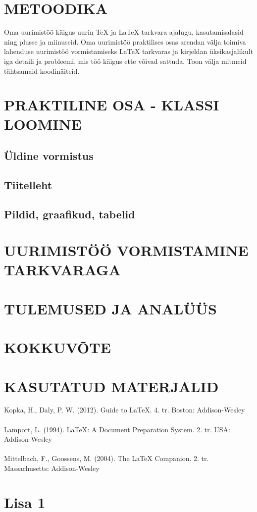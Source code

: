 \documentclass{21kuur}
\begin{document}
\chapter{METOODIKA}
Oma uurimistöö käigus uurin TeX ja LaTeX tarkvara ajalugu, kasutamisalasid ning plusse ja miinuseid. Oma uurimistöö praktilises osas arendan välja toimiva lahenduse uurimistöö vormistamiseks LaTeX tarkvaras ja kirjeldan üksikasjalikult iga detaili ja probleemi, mis töö käigus ette võivad sattuda. Toon välja mitmeid tähtsamaid koodinäiteid.

\chapter{PRAKTILINE OSA - KLASSI LOOMINE}
\section{Üldine vormistus}
\section{Tiitelleht}
\section{Pildid, graafikud, tabelid}

\chapter{UURIMISTÖÖ VORMISTAMINE \latex TARKVARAGA}

\chapter{TULEMUSED JA ANALÜÜS}
\newpage
\chapter*{KOKKUVÕTE}
\newpage
\chapter*{KASUTATUD MATERJALID}
Kopka, H., Daly, P. W. (2012). Guide to LaTeX. 4. tr. Boston: Addison-Wesley
\\\\Lamport, L. (1994). LaTeX: A Document Preparation System. 2. tr. USA: Addison-Wesley
\\\\Mittelbach, F., Goossens, M. (2004). The LaTeX Companion. 2. tr. Massachusetts: Addison-Wesley
\\

\newpage
{}
\chapter*{Lisa 1}
\end{document}

